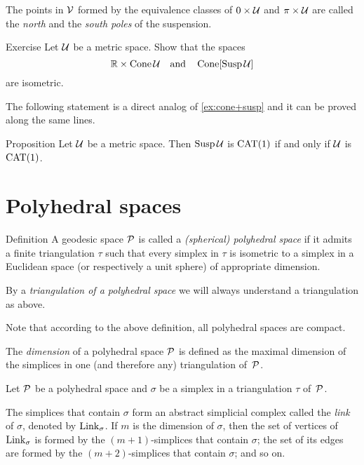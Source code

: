 The points in $\mathcal{V}$ formed by the equivalence classes of $0\times\mathcal{U}$ and $\pi\times\mathcal{U}$ are called  the {}\emph{north} and the \emph{south poles} of the suspension.

\begin{thm}{Exercise}\label{ex:product-cone}
Let $\mathcal{U}$ be a metric space.
Show that the spaces 
\[\mathbb{R}\times \mathop{\rm Cone}\nolimits\mathcal{U}\quad\text{and}\quad\mathop{\rm Cone}\nolimits[\mathop{\rm Susp}\nolimits\mathcal{U}]\]
are  isometric.
\end{thm}

The following statement is a direct analog of \ref{ex:cone+susp} and it can be proved along the same lines.

\begin{thm}{Proposition}\label{prop:susp}
Let $\mathcal{U}$ be a metric space.
Then $\mathop{\rm Susp}\nolimits\mathcal{U}$ is  $\mathrm{CAT}(1)$ if and only if $\mathcal{U}$ is $\mathrm{CAT}(1)$.
\end{thm}

\section{Polyhedral spaces}

\begin{thm}{Definition}\label{def:poly}
A geodesic space $\mathcal{P}$ is called  
a \emph{(spherical) polyhedral space} 
if it admits a finite triangulation $\tau$ 
such that every simplex in $\tau$ is isometric to a simplex in a Euclidean space (or respectively a unit sphere) of appropriate dimension.

By a 
\emph{triangulation of a polyhedral space} 
we will always understand a triangulation as above. 
\end{thm}

Note that according to the above definition,
all polyhedral spaces are compact.

The \emph{dimension} of a polyhedral space $\mathcal{P}$
is defined as the maximal dimension of the simplices 
in one (and therefore any) triangulation of~$\mathcal{P}$.

Let $\mathcal{P}$ be a polyhedral space
and $\sigma$ be a simplex in a triangulation $\tau$ of~$\mathcal{P}$.

The simplices that  contain $\sigma$
form an abstract simplicial complex called the \emph{link} of $\sigma$, 
denoted by $\mathop{\rm Link}\nolimits_\sigma$.
If $m$ is  the dimension of $\sigma$,
then the set of vertices of $\mathop{\rm Link}\nolimits_\sigma$
is formed by the $(m+1)$-simplices that  contain $\sigma$;
the set of its edges are formed by the $(m+2)$-simplices 
that contain $\sigma$; and so on.

